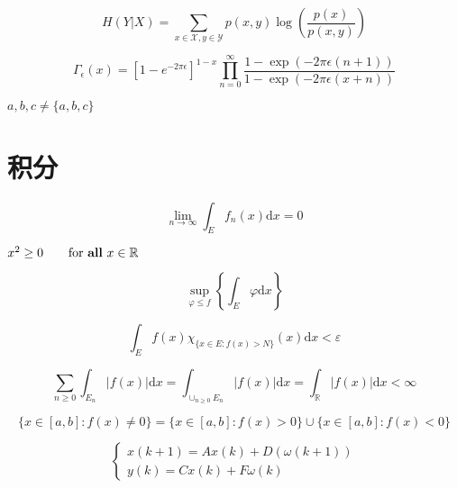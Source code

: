\documentclass{article}
\begin{document}
    \[
    H(Y | X)=\sum_{x \in \mathcal{X}, y \in \mathcal{Y}} p(x, y) \log \left(\frac{p(x)}{p(x, y)}\right)
    \]

    \[
    \Gamma_{\epsilon}(x)=\left[1-e^{-2 \pi \epsilon}\right]^{1-x} \prod_{n=0}^{\infty} \frac{1-\exp (-2 \pi \epsilon(n+1))}{1-\exp (-2 \pi \epsilon(x+n))}
    \]

    ${a,b,c}\neq \{a,b,c\}$ %

    \section{积分}
    \[
    \lim _{n \rightarrow \infty} \int_{E} f_{n}(x) \mathrm{d} x=0
    \]

    $x^{2} \geq 0 \qquad
    \text{for \textbf{all} }
    x\in\mathbb{R}$

    \[
    \sup _{\varphi \leq f}\left\{\int_{E} \varphi \mathrm{d} x\right\}
    \]

    \[
    \int_{E} f(x) \chi_{\{x \in E: f(x)>N\}}(x) \mathrm{d} x<\varepsilon
    \]

    \[
    \sum_{n \geq 0} \int_{E_{n}}|f(x)| \mathrm{d} x=\int_{\cup_{n \geq 0} E_{n}}|f(x)| \mathrm{d} x=\int_{\mathbb{R}}|f(x)| \mathrm{d} x<\infty
    \]
    
    \[
    \{x \in[a, b]: f(x) \neq 0\}=\{x \in[a, b]: f(x)>0\} \cup\{x \in[a, b]: f(x)<0\}
    \]

    \[
    \left\{\begin{array}{ll}
    { x(k+1) = Ax(k) + D(\omega(k+1)) }  \\  %
    { y(k) = Cx(k)+F\omega(k) }
    \end{array}\right.
    \]

    
\end{document}
